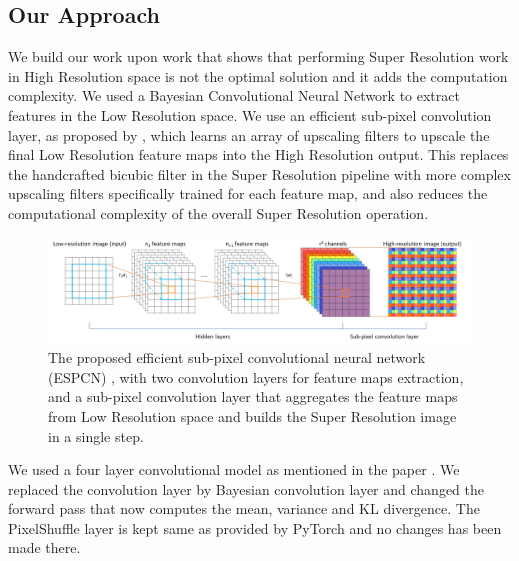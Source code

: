 \subsection{Our Approach}

We build our work upon \citet{DBLP:journals/corr/ShiCHTABRW16} work that shows that performing Super Resolution work in High Resolution space is not the optimal solution and it adds the computation complexity. We used a Bayesian Convolutional Neural Network to extract features in the Low Resolution space. We use an efficient sub-pixel convolution layer, as proposed by \citet{DBLP:journals/corr/ShiCHTABRW16}, which learns an array of upscaling filters to upscale the final Low Resolution feature maps into the High Resolution output. This replaces the handcrafted bicubic filter in the Super Resolution pipeline with more complex upscaling filters specifically trained for each feature map, and also reduces the computational complexity of the overall Super Resolution operation.

\begin{figure}[htbp]
\begin{center}
\includegraphics[width=1.0\linewidth]{Chapter6/Figs/networkstructure.jpg}
\caption{The proposed efficient sub-pixel convolutional neural network (ESPCN) \cite{DBLP:journals/corr/ShiCHTABRW16}, with two convolution layers for feature maps extraction, and a sub-pixel convolution layer that aggregates the feature maps from Low Resolution space and builds the Super Resolution image in a single step.}
\label{fig:networkstructure}
\end{center}
\end{figure}

We used a four layer convolutional model as mentioned in the paper \cite{DBLP:journals/corr/ShiCHTABRW16}. We replaced the convolution layer by Bayesian convolution layer and changed the forward pass that now computes the mean, variance and KL divergence. The PixelShuffle layer is kept same as provided by PyTorch and no changes has been made there.  


